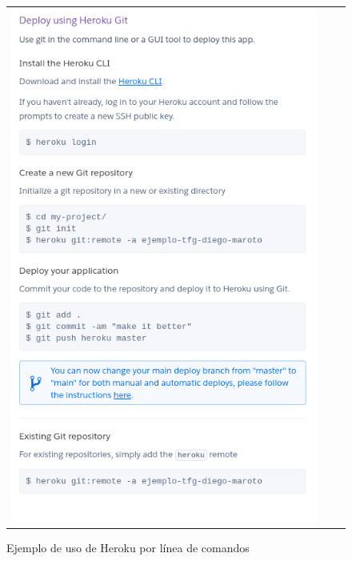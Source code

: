 \begin{figure}[h]
\centering
\begin{tabular}{ccc}
\includegraphics[scale=0.5]{archivos/heroku03.png}
\end{tabular}
\caption{Ejemplo de uso de Heroku por línea de comandos}
\end{figure}
\clearpage
\clearpage
